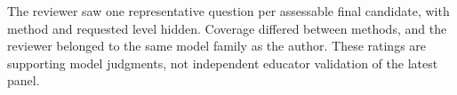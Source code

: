 The reviewer saw one representative question per assessable final candidate, with method and requested level hidden. Coverage differed between methods, and the reviewer belonged to the same model family as the author. These ratings are supporting model judgments, not independent educator validation of the latest panel.
